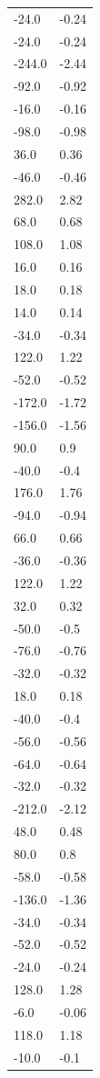 \begin{longtable}{ll}
-24.0 & -0.24 \\
-24.0 & -0.24 \\
-244.0 & -2.44 \\
-92.0 & -0.92 \\
-16.0 & -0.16 \\
-98.0 & -0.98 \\
36.0 & 0.36 \\
-46.0 & -0.46 \\
282.0 & 2.82 \\
68.0 & 0.68 \\
108.0 & 1.08 \\
16.0 & 0.16 \\
18.0 & 0.18 \\
14.0 & 0.14 \\
-34.0 & -0.34 \\
122.0 & 1.22 \\
-52.0 & -0.52 \\
-172.0 & -1.72 \\
-156.0 & -1.56 \\
90.0 & 0.9 \\
-40.0 & -0.4 \\
176.0 & 1.76 \\
-94.0 & -0.94 \\
66.0 & 0.66 \\
-36.0 & -0.36 \\
122.0 & 1.22 \\
32.0 & 0.32 \\
-50.0 & -0.5 \\
-76.0 & -0.76 \\
-32.0 & -0.32 \\
18.0 & 0.18 \\
-40.0 & -0.4 \\
-56.0 & -0.56 \\
-64.0 & -0.64 \\
-32.0 & -0.32 \\
-212.0 & -2.12 \\
48.0 & 0.48 \\
80.0 & 0.8 \\
-58.0 & -0.58 \\
-136.0 & -1.36 \\
-34.0 & -0.34 \\
-52.0 & -0.52 \\
-24.0 & -0.24 \\
128.0 & 1.28 \\
-6.0 & -0.06 \\
118.0 & 1.18 \\
-10.0 & -0.1 \\

\end{longtable}
